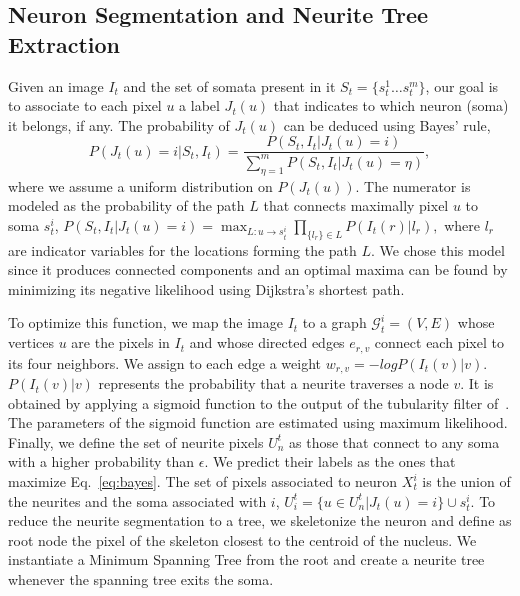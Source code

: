 \subsection{Neuron Segmentation and Neurite Tree Extraction}
\label{sec:segmentation}
\vspace{-2mm}
Given an  image $I_t$  and the set  of somata  present in it  $S_t=\{s_t^1 \dots
s_t^m \}$,  our goal is  to associate  to each pixel  $u$ a label  $J_t(u)$ that
indicates to which neuron (soma) it belongs, if any.   The probability of $J_t(u)$ can be deduced
using Bayes' rule,
\begin{equation}
  \label{eq:bayes}
  P(J_t(u)=i|S_t,I_t) = \frac{P(S_t,I_t| J_t(u)=i)}{\sum_{\eta=1}^m P(S_t,I_t|J_t(u)=\eta)},
\end{equation}
\noindent where we assume a  uniform distribution on $P(J_t(u))$.  The numerator
is modeled as the probability of  the path $L$ that connects maximally pixel
$u$ to  soma $s_t^i$,  $ P(S_t,I_t| J_t(u)=i) =  \max_{L:u\rightarrow s_t^i}
\prod_{\{l_{r}\} \in L } P(I_t(r)|l_{r}),$ where $l_{r}$ are indicator variables
for the  locations forming the path $L$.  We chose this model  since it produces
connected  components and  an  optimal maxima  can  be found  by minimizing  its
negative likelihood using Dijkstra's shortest path.

To optimize this function, we map  the image $I_t$ to a graph $\mathcal{G}_t^i =
(V,E)$  whose vertices  $u$ are  the pixels  in $I_t$  and whose  directed edges
$e_{r,v}$ connect  each pixel to its four  neighbors.  We assign to  each edge a
weight $w_{r,v}  = -log P(I_t(v)|v)$.  $P(I_t(v)|v)$  represents the probability
that  a neurite  traverses a  node $v$.  It is  obtained by  applying  a sigmoid
function  to  the  output  of  the tubularity  filter  of~\cite{Frangi98}.   The
parameters   of    the   sigmoid   function   are    estimated   using   maximum
likelihood. Finally, we  define the set of neurite pixels  $U_n^t$ as those that
connect to any soma with a higher probability than $\epsilon$.  We predict their
labels  as  the  ones  that  maximize Eq.~\ref{eq:bayes}.   The  set  of  pixels
associated  to  neuron  $X_t^i$ is  the  union  of  the  neurites and  the  soma
associated with  $i$, $ U_i^t  = \{u \in  U_n^t | J_t(u)  = i\} \cup  s_t^i$. To
reduce the neurite segmentation to a  tree, we skeletonize the neuron and define
as  root  node  the pixel  of  the  skeleton  closest  to  the centroid  of  the
nucleus.  We instantiate  a Minimum  Spanning Tree  from the  root and  create a
neurite tree whenever the spanning tree exits the soma.




